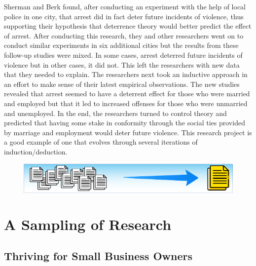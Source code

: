 Sherman and Berk found, after conducting an experiment with the help of local police in one city, that arrest did in fact deter future incidents of violence, thus supporting their hypothesis that deterrence theory would better predict the effect of arrest. After conducting this research, they and other researchers went on to conduct similar experiments in six additional cities but the results from these follow-up studies were mixed. In some cases, arrest deterred future incidents of violence but in other cases, it did not. This left the researchers with new data that they needed to explain. The researchers next took an inductive approach in an effort to make sense of their latest empirical observations. The new studies revealed that arrest seemed to have a deterrent effect for those who were married and employed but that it led to increased offenses for those who were unmarried and unemployed. In the end, the researchers turned to control theory and predicted that having some stake in conformity through the social ties provided by marriage and employment would deter future violence. This research project is a good example of one that evolves through several iterations of induction/deduction.

\noindent\begin{minipage}{\textwidth}
	\begin{figure}[H]
		\centering
		\includegraphics[width=.85\linewidth]{gfx/Sampling_Of_Research}
		\caption*{}
		\label{01:sampling_of_research}
	\end{figure}
	\vspace{-10.0ex} %
	\section{A Sampling of Research}
\end{minipage}
\subsection{Thriving for Small Business Owners}

